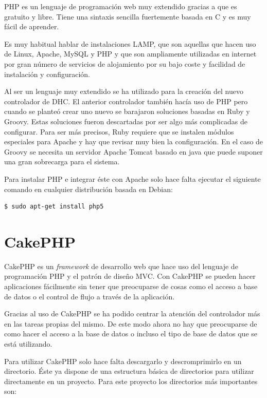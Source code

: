 PHP es un lenguaje de programación web muy extendido gracias a que es gratuito y libre. Tiene una sintaxis sencilla fuertemente basada en C y es muy fácil de aprender.

Es muy habitual hablar de instalaciones LAMP, que son aquellas que hacen uso de Linux, Apache, MySQL y PHP y que son ampliamente utilizadas en internet por gran número de servicios de alojamiento por su bajo coste y facilidad de instalación y configuración.

Al ser un lenguaje muy extendido se ha utilizado para la creación del nuevo controlador de DHC. El anterior controlador también hacía uso de PHP pero cuando se planteó crear uno nuevo se barajaron soluciones basadas en Ruby y Groovy. Estas soluciones fueron descartadas por ser algo más complicadas de configurar. Para ser más precisos, Ruby requiere que se instalen módulos especiales para Apache y hay que revisar muy bien la configuración. En el caso de Groovy se necesita un servidor Apache Tomcat basado en java que puede suponer una gran sobrecarga para el sistema.

Para instalar PHP e integrar éste con Apache solo hace falta ejecutar el siguiente comando en cualquier distribución basada en Debian:

\begin{verbatim}
$ sudo apt-get install php5
\end{verbatim}

\section{CakePHP}

CakePHP es un \emph{framework} de desarrollo web que hace uso del lenguaje de programación PHP y el patrón de diseño MVC. Con CakePHP se pueden hacer aplicaciones fácilmente sin tener que preocuparse de cosas como el acceso a base de datos o el control de flujo a través de la aplicación.

Gracias al uso de CakePHP se ha podido centrar la atención del controlador más en las tareas propias del mismo. De este modo ahora no hay que preocuparse de como hacer el acceso a la base de datos o incluso el tipo de base de datos que se está utilizando.

Para utilizar CakePHP solo hace falta descargarlo y descromprimirlo en un directorio. Éste ya dispone de una estructura básica de directorios para utilizar directamente en un proyecto. Para este proyecto los directorios más importantes son:

